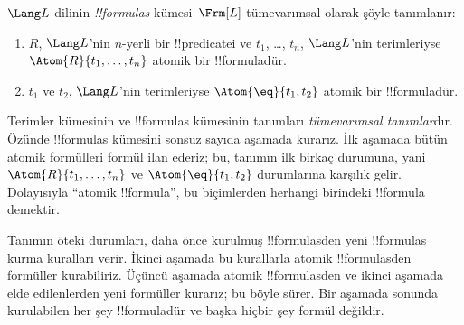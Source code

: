 \documentclass[../../../include/open-logic-section]{subfiles}
\begin{document}
\begin{defn}[Formüller]
$\Lang L$ dilinin \emph{!!{formula}s} kümesi~$\Frm[L]$ tümevarımsal
olarak şöyle tanımlanır:
\begin{enumerate}


\item $R$, $\Lang L$'nin $n$-yerli bir !!{predicate}{}i ve $t_1$, \dots,
  $t_n$, $\Lang L$'nin terimleriyse $\Atom{R}{t_1,\ldots, t_n}$ atomik bir
  !!{formula}{}dür.

\item $t_1$ ve $t_2$, $\Lang L$'nin terimleriyse $\Atom{\eq}{t_1, t_2}$
  atomik bir !!{formula}{}dür.








\end{enumerate}
\end{defn}

\begin{explain}
Terimler kümesinin ve !!{formula}s kümesinin tanımları
\emph{tümevarımsal tanımlar}dır. Özünde !!{formula}s kümesini sonsuz
sayıda aşamada kurarız. İlk aşamada bütün atomik formülleri formül ilan
ederiz; bu, tanımın ilk birkaç durumuna, yani
%
%
$\Atom{R}{t_1,\dots,t_n}$ ve $\Atom{\eq}{t_1,t_2}$ durumlarına karşılık
gelir. Dolayısıyla ``atomik !!{formula}'', bu biçimlerden herhangi birindeki
!!{formula} demektir.

Tanımın öteki durumları, daha önce kurulmuş !!{formula}s{}den yeni
!!{formula}s kurma kuralları verir. İkinci aşamada bu kurallarla atomik
!!{formula}s{}den formüller kurabiliriz. Üçüncü aşamada atomik
!!{formula}s{}den ve ikinci aşamada elde edilenlerden yeni formüller kurarız;
bu böyle sürer. Bir aşamada sonunda kurulabilen her şey !!{formula}{}dür
ve başka hiçbir şey formül değildir.
\end{explain}
\end{document}

